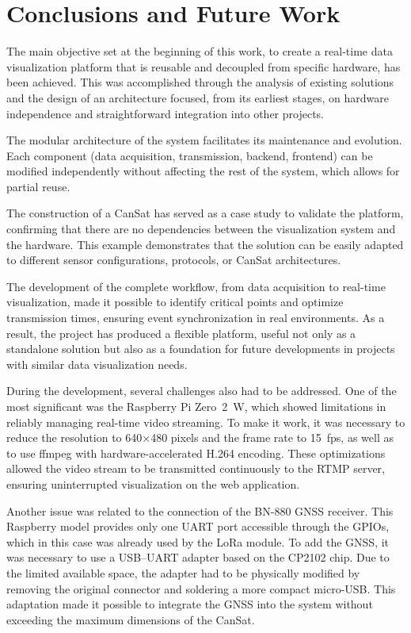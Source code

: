 \chapter{Conclusions and Future Work}
\label{cap:conclusions}

The main objective set at the beginning of this work, to create a real-time data 
visualization platform that is reusable and decoupled from specific hardware, has been 
achieved. This was accomplished through the analysis of existing solutions and the design 
of an architecture focused, from its earliest stages, on hardware independence and 
straightforward integration into other projects.

The modular architecture of the system facilitates its maintenance and evolution. Each 
component (data acquisition, transmission, backend, frontend) can be 
modified independently without affecting the rest of the system, which allows for partial 
reuse.

The construction of a CanSat has served as a case study to validate the platform, 
confirming that there are no dependencies between the visualization system and the 
hardware. This example demonstrates that the solution can be easily adapted to different 
sensor configurations, protocols, or CanSat architectures.

The development of the complete workflow, from data acquisition to real-time 
visualization, made it possible to identify critical points and optimize transmission 
times, ensuring event synchronization in real environments. As a result, the project has 
produced a flexible platform, useful not only as a standalone solution but also as a 
foundation for future developments in projects with similar data visualization needs.

During the development, several challenges also had to be addressed. One of the most 
significant was the Raspberry Pi Zero~2~W, which showed limitations in reliably managing 
real-time video streaming. To make it work, it was necessary to reduce the resolution to 
640×480 pixels and the frame rate to 15~fps, as well as to use ffmpeg with 
hardware-accelerated H.264 encoding. These optimizations allowed the video stream to be 
transmitted continuously to the RTMP server, ensuring uninterrupted visualization on the 
web application.

Another issue was related to the connection of the BN-880 GNSS receiver. This Raspberry 
model provides only one UART port accessible through the GPIOs, which in this case was 
already used by the LoRa module. To add the GNSS, it was necessary to use a USB–UART 
adapter based on the CP2102 chip. Due to the limited available space, the adapter had to 
be physically modified by removing the original connector and soldering a more compact 
micro-USB. This adaptation made it possible to integrate the GNSS into the system without 
exceeding the maximum dimensions of the CanSat.

